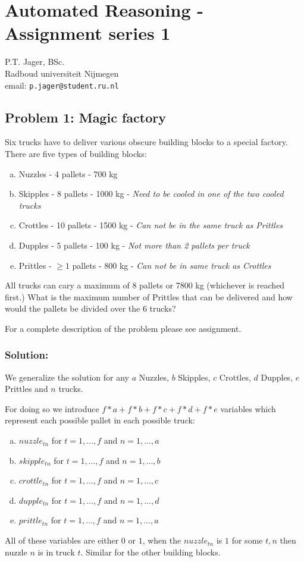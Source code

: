 \documentclass[12pt]{article}
\begin{document}
\section*{Automated Reasoning - Assignment series 1 }

\begin{center}
P.T. Jager, BSc. \\
Radboud universiteit Nijmegen\\
email: {\tt p.jager@student.ru.nl}
\end{center}

\subsection*{Problem 1: Magic factory}

Six trucks have to deliver various obscure building blocks to a special 
factory. There are five types of building blocks:
\begin{enumerate}[(a)]
	\item Nuzzles - 4 pallets - 700 kg 
	\item Skipples - 8 pallets - 1000 kg - \textit{Need to be cooled in
		one of the two cooled trucks}
	\item Crottles - 10 pallets - 1500 kg - \textit{Can not be in the same truck
		as Prittles}
	\item Dupples - 5 pallets - 100 kg - \textit{Not more than 2 pallets per
		truck}
	\item Prittles - $\geq 1$ pallets - 800 kg - \textit{Can not be in same 
		truck as Crottles}
\end{enumerate}
All trucks can cary a maximum of 8 pallets or 7800 kg (whichever is reached 
first.)
What is the maximum number of Prittles that can be delivered and how would the
pallets be divided over the 6 trucks?

For a complete description of the problem please see assignment. 

\subsubsection*{Solution:}

We generalize the solution for any $a$ Nuzzles, $b$ Skipples, $c$ Crottles, 
$d$ Dupples, $e$ Prittles and $n$ trucks.

For doing so we introduce $f*a + f*b + f*c + f*d + f*e$ variables which 
represent each possible pallet in each possible truck: 
\begin{enumerate}[(a)]
	\item $nuzzle_{tn}$ for $t=1,\ldots,f$ and $n=1,\ldots,a$
	\item $skipple_{tn}$ for $t=1,\ldots,f$ and $n=1,\ldots,b$
	\item $crottle_{tn}$ for $t=1,\ldots,f$ and $n=1,\ldots,c$
	\item $dupple_{tn}$ for $t=1,\ldots,f$ and $n=1,\ldots,d$
	\item $prittle_{tn}$ for $t=1,\ldots,f$ and $n=1,\ldots,a$
\end{enumerate}
All of these variables are either $0$ or $1$, when the $nuzzle_{tn}$ 
is $1$ for some $t,n$ then nuzzle $n$ is in truck $t$. Similar for the other 
building blocks.
\end{document}
